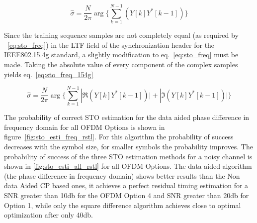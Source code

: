 \begin{equation} 
\hat{\sigma} = \frac{N}{2\pi} \arg \{  \sum\limits_{k=1}^{N-1} (Y[k]Y^{*}[k-1]  ) \}
\label{eq:sto_freq} 
\end{equation}

Since the training sequence samples are not completely equal (as required by ~\ref{eq:sto_freq}) in the LTF field  of the synchronization header for the IEEE802.15.4g standard, a slightly modification to eq.~\ref{eq:sto_freq} must be made. Taking the absolute value of every component of the complex samples yields eq.~\ref{eq:sto_freq_154g} 


\begin{equation} 
\hat{\sigma} = \frac{N}{2\pi} \arg \{  \sum\limits_{k=1}^{N-1} |\Re{(Y[k]Y^{*}[k-1])|} + |\Im{(Y[k]Y^{*}[k-1])|} \} 
\label{eq:sto_freq_154g} 
\end{equation}

The probability of correct STO estimation for the data aided phase difference in frequency domain for all OFDM Options is shown in figure~\ref{fig:sto_esti_freq_rstl}. For this algorithm the probability of success decreases with the symbol size, for smaller symbols the probability improves. The probability of success of the three STO estimation methods for a noisy channel is shown in \ref{fig:sto_esti_all_rstl} for all OFDM Options. The data aided algorithm (the phase difference in frequency domain) shows better results than the Non data Aided CP based ones, it achieves a perfect residual timing estimation for a SNR greater than 10db for the OFDM Option 4 and SNR greater than 20db for Option 1, while only the square difference algorithm achieves close to optimal optimization after only 40db.


